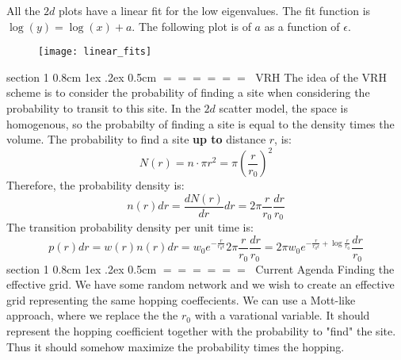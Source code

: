 \documentclass[onecolumn,fleqn,notitlepage,secnumarabic]{revtex4}
\makeatletter
\def\section{%
  \@startsection
    {section}%
    {1}%
    {\z@}%
    {0.8cm \@plus1ex \@minus .2ex}%
    {0.5cm}%
    {\Large\bf $=\!=\!=\!=\!=\!=\;$}%
}%
\makeatother
\begin{document}
All the $2d$ plots have a linear fit for the low eigenvalues. The fit function is $\log(y) = \log(x) + a$. The following plot is of $a$ as a function of $\epsilon$.

\begin{figure}[H]
\texttt{[image: linear\_fits]}
\end{figure}

\section{VRH}
The idea of the VRH scheme is to consider the probability of finding a site when considering the probability to transit to this site. In the $2d$ scatter model, the space is homogenous, so the probabilty of finding a site is equal to the density times the volume. The probability to find a site {\bf up to} distance $r$, is:
\[ N(r) = n\cdot \pi r^2 = \pi \left(\frac{r}{r_0}\right)^2\]
Therefore, the probability density is:
\[ n(r)dr = \frac{dN(r)}{dr}dr = 2\pi \frac{r}{r_0}\frac{dr}{r_0}\]
The transition probability density per unit time is:
\[p(r)dr = w(r)n(r)dr = w_0 e^{-\frac{r}{r_0\epsilon}}2\pi \frac{r}{r_0}\frac{dr}{r_0}=2\pi w_0 e^{-\frac{r}{r_0\epsilon} + \log\frac{r}{r_0}}\frac{dr}{r_0}\]
\section{Current Agenda}
Finding the effective grid. We have some random network and we wish to create an effective grid representing the same hopping coeffecients. We can use a Mott-like approach, where we replace the the $r_0$ with a varational variable. It should represent the hopping coefficient together with the probability to "find" the site. Thus it should somehow maximize the probability times the hopping. 



%

\end{document}
